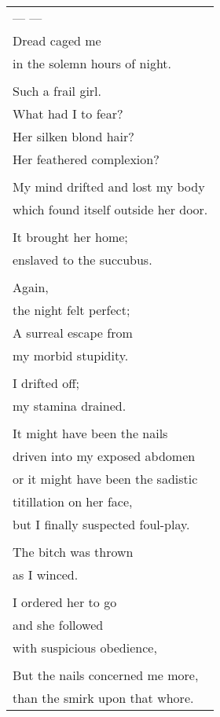 \documentclass{article}
\begin{document}
\begin{tabular}{l}
\\
--- --- \\
Dread caged me \\
in the solemn hours of night. \\
\\
Such a frail girl. \\
What had I to fear? \\
Her silken blond hair? \\
Her feathered complexion? \\
\\
My mind drifted and lost my body \\
which found itself outside her door. \\
\\
It brought her home; \\
enslaved to the succubus. \\
\\
Again, \\
the night felt perfect; \\
A surreal escape from \\
my morbid stupidity. \\
\\
I drifted off; \\
my stamina drained. \\
\\
It might have been the nails \\
driven into my exposed abdomen \\
or it might have been the sadistic \\
titillation on her face, \\
but I finally suspected foul-play. \\
\\
The bitch was thrown \\
as I winced. \\
\\
I ordered her to go \\
and she followed \\
with suspicious obedience, \\
\\
But the nails concerned me more, \\
than the smirk upon that whore. \\
\end{tabular} \\
\end{document}
